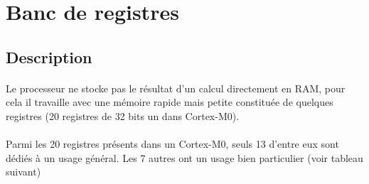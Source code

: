 \documentclass{article}
\begin{document}
    \section{Banc de registres}
    \label{sec:BDR}

    \subsection{Description}

    \paragraph{}
    Le processeur ne stocke pas le résultat d'un calcul directement en RAM, pour cela il travaille avec une mémoire rapide mais petite constituée de quelques registres (20 registres de 32 bits un dans Cortex-M0).

    \paragraph{}
    Parmi les 20 registres présents dans un Cortex-M0, seuls 13 d'entre eux sont dédiés à un usage général.
    Les 7 autres ont un usage bien particulier (voir tableau suivant)

    \vspace{1em}
\end{document}
